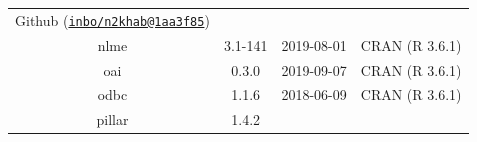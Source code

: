 \documentclass[11pt,]{book}
\begin{document}
\begin{longtable}[]{@{}cccc@{}}
\begin{minipage}[t]{0.36\columnwidth}
Github
(\href{mailto:inbo/n2khab@1aa3f85}{\nolinkurl{inbo/n2khab@1aa3f85}})\strut
\end{minipage}\tabularnewline
\begin{minipage}[t]{0.18\columnwidth}\centering\strut
nlme\strut
\end{minipage} & \begin{minipage}[t]{0.19\columnwidth}\centering\strut
3.1-141\strut
\end{minipage} & \begin{minipage}[t]{0.16\columnwidth}\centering\strut
2019-08-01\strut
\end{minipage} & \begin{minipage}[t]{0.36\columnwidth}\centering\strut
CRAN (R 3.6.1)\strut
\end{minipage}\tabularnewline
\begin{minipage}[t]{0.18\columnwidth}\centering\strut
oai\strut
\end{minipage} & \begin{minipage}[t]{0.19\columnwidth}\centering\strut
0.3.0\strut
\end{minipage} & \begin{minipage}[t]{0.16\columnwidth}\centering\strut
2019-09-07\strut
\end{minipage} & \begin{minipage}[t]{0.36\columnwidth}\centering\strut
CRAN (R 3.6.1)\strut
\end{minipage}\tabularnewline
\begin{minipage}[t]{0.18\columnwidth}\centering\strut
odbc\strut
\end{minipage} & \begin{minipage}[t]{0.19\columnwidth}\centering\strut
1.1.6\strut
\end{minipage} & \begin{minipage}[t]{0.16\columnwidth}\centering\strut
2018-06-09\strut
\end{minipage} & \begin{minipage}[t]{0.36\columnwidth}\centering\strut
CRAN (R 3.6.1)\strut
\end{minipage}\tabularnewline
\begin{minipage}[t]{0.18\columnwidth}\centering\strut
pillar\strut
\end{minipage} & \begin{minipage}[t]{0.19\columnwidth}\centering\strut
1.4.2\strut
\end{minipage} & \begin{minipage}[t]{0.16\columnwidth}\centering\strut

\end{minipage}
\end{longtable}
\end{document}
